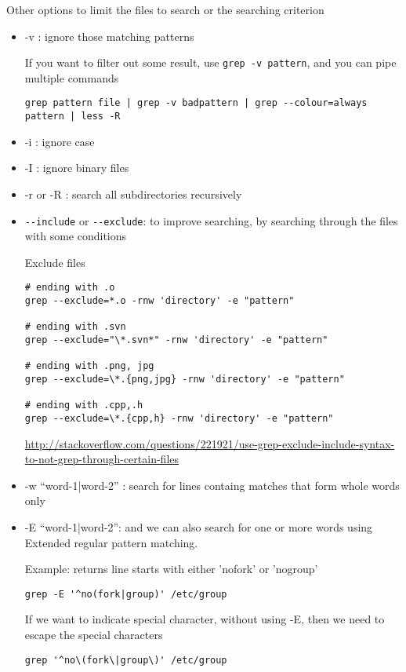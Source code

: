 Other options to limit the files to search or the searching criterion
\begin{itemize}
  \item -v : ignore those matching patterns
  
If you want to filter out some result, use \verb!grep -v pattern!, and you can
pipe multiple commands
\begin{verbatim}
grep pattern file | grep -v badpattern | grep --colour=always pattern | less -R
\end{verbatim}

  \item -i : ignore case

  \item -I : ignore binary files

  \item -r  or -R : search all subdirectories recursively
  
  \item \verb!--include!  or \verb!--exclude!: to improve searching, by
  searching through the files with some conditions

Exclude files 
\begin{verbatim}
# ending with .o
grep --exclude=*.o -rnw 'directory' -e "pattern"

# ending with .svn
grep --exclude="\*.svn*" -rnw 'directory' -e "pattern"

# ending with .png, jpg
grep --exclude=\*.{png,jpg} -rnw 'directory' -e "pattern"

# ending with .cpp,.h
grep --exclude=\*.{cpp,h} -rnw 'directory' -e "pattern"
\end{verbatim}
\url{http://stackoverflow.com/questions/221921/use-grep-exclude-include-syntax-to-not-grep-through-certain-files}


  \item -w ``word-1|word-2'' : search for lines containg matches that form whole
  words only 
  
  \item -E ``word-1|word-2'': and we can also search for one or more words using
  Extended regular pattern matching.
  
Example: returns line starts with either 'nofork' or 'nogroup' 
\begin{verbatim}
grep -E '^no(fork|group)' /etc/group
\end{verbatim}

If we want to indicate special character, without using -E, then we need to
escape the special characters
\begin{verbatim}
grep '^no\(fork\|group\)' /etc/group
\end{verbatim}

\end{itemize}

